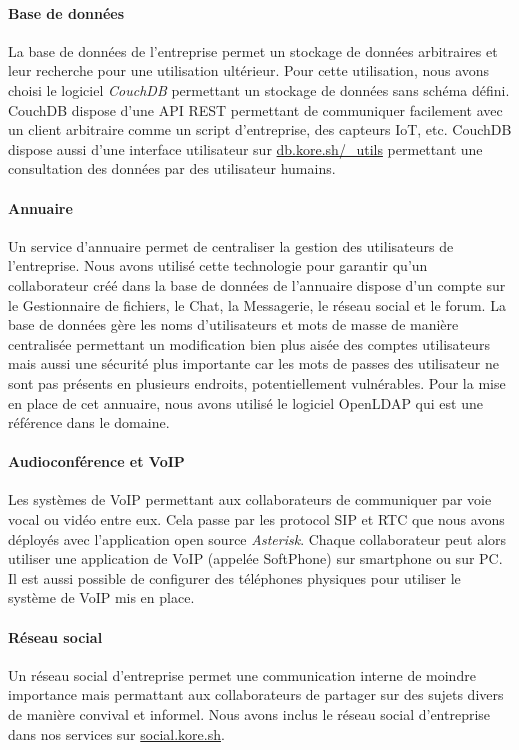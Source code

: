 \paragraph{Base de données} La base de données de l'entreprise permet un stockage de données arbitraires et leur recherche pour une utilisation ultérieur.
Pour cette utilisation, nous avons choisi le logiciel \emph{CouchDB} permettant un stockage de données sans schéma défini.
CouchDB dispose d'une API REST permettant de communiquer facilement avec un client arbitraire comme un script d'entreprise, des capteurs IoT, etc.
CouchDB dispose aussi d'une interface utilisateur sur \url{db.kore.sh/_utils} permettant une consultation des données par des utilisateur humains.

\paragraph{Annuaire} Un service d'annuaire permet de centraliser la gestion des utilisateurs de l'entreprise.
Nous avons utilisé cette technologie pour garantir qu'un collaborateur créé dans la base de données de l'annuaire dispose d'un compte sur le Gestionnaire de fichiers, le Chat, la Messagerie, le réseau social et le forum.
La base de données gère les noms d'utilisateurs et mots de masse de manière centralisée permettant un modification bien plus aisée des comptes utilisateurs mais aussi une sécurité plus importante car les mots de passes des utilisateur ne sont pas présents en plusieurs endroits, potentiellement vulnérables.
Pour la mise en place de cet annuaire, nous avons utilisé le logiciel OpenLDAP qui est une référence dans le domaine.

\paragraph{Audioconférence et VoIP} Les systèmes de VoIP permettant aux collaborateurs de communiquer par voie vocal ou vidéo entre eux.
Cela passe par les protocol SIP et RTC que nous avons déployés avec l'application open source \emph{Asterisk}.
Chaque collaborateur peut alors utiliser une application de VoIP (appelée SoftPhone) sur smartphone ou sur PC.
Il est aussi possible de configurer des téléphones physiques pour utiliser le système de VoIP mis en place.

\paragraph{Réseau social} Un réseau social d'entreprise permet une communication interne de moindre importance mais permattant aux collaborateurs de partager sur des sujets divers de manière convival et informel.
Nous avons inclus le réseau social d'entreprise dans nos services sur \url{social.kore.sh}.

